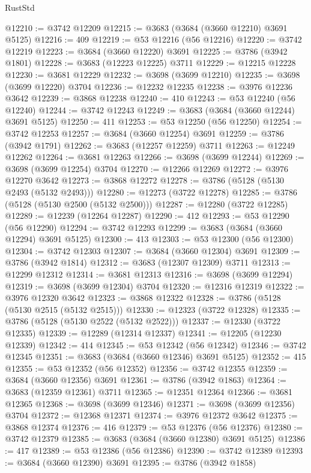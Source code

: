 \begin{lexlean}{RustStd}
\begin{coremodule}
@12210 := @3742 @12209
@12215 := @3683 (@3684 (@3660 @12210) @3691 @5125)
@12216 := 409
@12219 := @53 @12216 (@56 @12216)
@12220 := @3742 @12219
@12223 := @3684 (@3660 @12220) @3691
@12225 := @3786 (@3942 @1801)
@12228 := @3683 (@12223 @12225) @3711
@12229 := @12215 @12228
@12230 := @3681 @12229
@12232 := @3698 (@3699 @12210)
@12235 := @3698 (@3699 @12220) @3704
@12236 := @12232 @12235
@12238 := @3976 @12236 @3642
@12239 := @3868 @12238
@12240 := 410
@12243 := @53 @12240 (@56 @12240)
@12244 := @3742 @12243
@12249 := @3683 (@3684 (@3660 @12244) @3691 @5125)
@12250 := 411
@12253 := @53 @12250 (@56 @12250)
@12254 := @3742 @12253
@12257 := @3684 (@3660 @12254) @3691
@12259 := @3786 (@3942 @1791)
@12262 := @3683 (@12257 @12259) @3711
@12263 := @12249 @12262
@12264 := @3681 @12263
@12266 := @3698 (@3699 @12244)
@12269 := @3698 (@3699 @12254) @3704
@12270 := @12266 @12269
@12272 := @3976 @12270 @3642
@12273 := @3868 @12272
@12278 := @3786 (@5128 (@5130 @2493 (@5132 @2493)))
@12280 := @12273 (@3722 @12278)
@12285 := @3786 (@5128 (@5130 @2500 (@5132 @2500)))
@12287 := @12280 (@3722 @12285)
@12289 := @12239 (@12264 @12287)
@12290 := 412
@12293 := @53 @12290 (@56 @12290)
@12294 := @3742 @12293
@12299 := @3683 (@3684 (@3660 @12294) @3691 @5125)
@12300 := 413
@12303 := @53 @12300 (@56 @12300)
@12304 := @3742 @12303
@12307 := @3684 (@3660 @12304) @3691
@12309 := @3786 (@3942 @1814)
@12312 := @3683 (@12307 @12309) @3711
@12313 := @12299 @12312
@12314 := @3681 @12313
@12316 := @3698 (@3699 @12294)
@12319 := @3698 (@3699 @12304) @3704
@12320 := @12316 @12319
@12322 := @3976 @12320 @3642
@12323 := @3868 @12322
@12328 := @3786 (@5128 (@5130 @2515 (@5132 @2515)))
@12330 := @12323 (@3722 @12328)
@12335 := @3786 (@5128 (@5130 @2522 (@5132 @2522)))
@12337 := @12330 (@3722 @12335)
@12339 := @12289 (@12314 @12337)
@12341 := @12205 (@12230 @12339)
@12342 := 414
@12345 := @53 @12342 (@56 @12342)
@12346 := @3742 @12345
@12351 := @3683 (@3684 (@3660 @12346) @3691 @5125)
@12352 := 415
@12355 := @53 @12352 (@56 @12352)
@12356 := @3742 @12355
@12359 := @3684 (@3660 @12356) @3691
@12361 := @3786 (@3942 @1863)
@12364 := @3683 (@12359 @12361) @3711
@12365 := @12351 @12364
@12366 := @3681 @12365
@12368 := @3698 (@3699 @12346)
@12371 := @3698 (@3699 @12356) @3704
@12372 := @12368 @12371
@12374 := @3976 @12372 @3642
@12375 := @3868 @12374
@12376 := 416
@12379 := @53 @12376 (@56 @12376)
@12380 := @3742 @12379
@12385 := @3683 (@3684 (@3660 @12380) @3691 @5125)
@12386 := 417
@12389 := @53 @12386 (@56 @12386)
@12390 := @3742 @12389
@12393 := @3684 (@3660 @12390) @3691
@12395 := @3786 (@3942 @1858)

\end{coremodule}
\end{lexlean}
